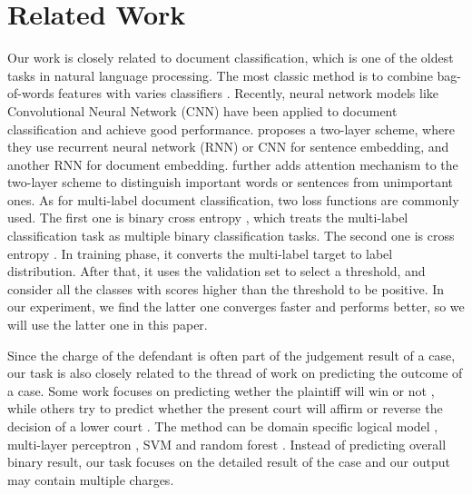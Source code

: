 \section{Related Work}
Our work is closely related to document classification, which is one of the oldest tasks in natural language processing. The most classic method is to combine bag-of-words features with varies classifiers \cite{joachims1998text}. Recently, neural network models like Convolutional Neural Network (CNN) \cite{kim2014convolutional} have been applied to document classification and achieve good performance. \cite{tang2015document} proposes a two-layer scheme, where they use recurrent neural network (RNN) or CNN for sentence embedding, and another RNN for document embedding. \cite{yang2016hierarchical} further adds attention mechanism to the two-layer scheme to distinguish important words or sentences from unimportant ones. As for multi-label document classification, two loss functions are commonly used. The first one is binary cross entropy \cite{nam2014large}, which treats the multi-label classification task as multiple binary classification tasks. The second one is cross entropy \cite{kurata2016improved}. In training phase, it converts the multi-label target to label distribution. After that, it uses the validation set to select a threshold, and consider all the classes with scores higher than the threshold to be positive. In our experiment, we find the latter one converges faster and performs better, so we will use the latter one in this paper.



Since the charge of the defendant is often part of the judgement result of a case, our task is also closely related to the thread of work on predicting the outcome of a case. Some work focuses on predicting wether the plaintiff will win or not \cite{aletras2016predicting}, while others try to predict whether the present court will affirm or reverse the decision of a lower court \cite{katz2016general}. The method can be domain specific logical model \cite{bruninghaus2003predicting}, multi-layer perceptron \cite{bench1993neural}, SVM \cite{aletras2016predicting} and random forest \cite{katz2016general}. Instead of predicting overall binary result, our task focuses on the detailed result of the case and our output may contain multiple charges.

